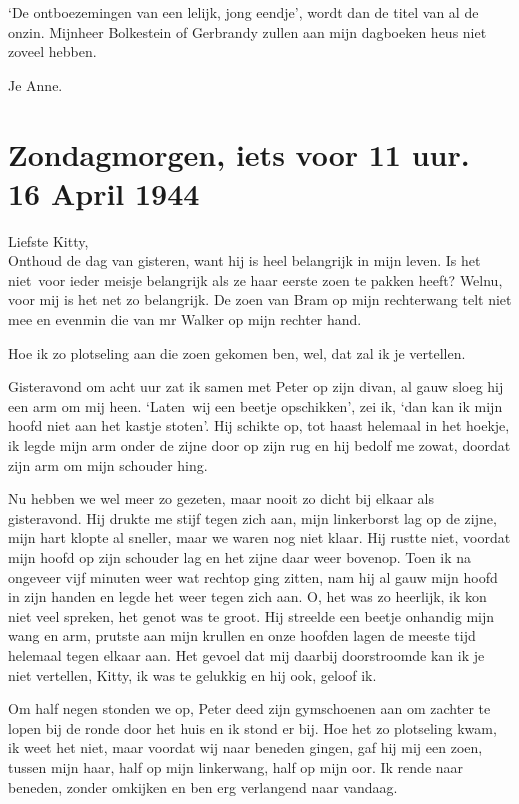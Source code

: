 \documentclass{book}
\begin{document}
`De ontboezemingen van een lelijk, jong eendje', wordt dan de titel van al de
onzin. Mijnheer Bolkestein of Gerbrandy zullen aan mijn dagboeken heus niet
zoveel hebben.

Je Anne.

\section*{Zondagmorgen, iets voor 11 uur. 16 April 1944}

Liefste Kitty,\\
Onthoud de dag van gisteren, want hij is heel belangrijk in
mijn leven. Is het niet~voor ieder meisje belangrijk als ze haar eerste zoen te
pakken heeft? Welnu, voor mij is het net zo belangrijk.  De zoen van Bram op
mijn rechterwang telt niet mee en evenmin die van mr Walker op mijn rechter
hand.

Hoe ik zo plotseling aan die zoen gekomen ben, wel, dat zal ik je vertellen.

Gisteravond om acht uur zat ik samen met Peter op zijn divan, al gauw sloeg hij
een arm om mij heen. `Laten~wij een beetje opschikken', zei ik, `dan kan ik mijn
hoofd niet aan het kastje stoten'. Hij schikte op, tot haast helemaal in het
hoekje, ik legde mijn arm onder de zijne door op zijn rug en hij bedolf me
zowat, doordat zijn arm om mijn schouder hing.

Nu hebben we wel meer zo gezeten, maar nooit zo dicht bij elkaar als
gisteravond. Hij drukte me stijf tegen zich aan, mijn linkerborst lag op de
zijne, mijn hart klopte al sneller, maar we waren nog niet klaar. Hij rustte
niet, voordat mijn hoofd op zijn schouder lag en het zijne daar weer bovenop.
Toen ik na ongeveer vijf minuten weer wat rechtop ging zitten, nam hij al gauw
mijn hoofd in zijn handen en legde het weer tegen zich aan. O, het was zo
heerlijk, ik kon niet veel spreken, het genot was te groot. Hij streelde een
beetje onhandig mijn wang en arm, prutste aan mijn krullen en onze hoofden lagen
de meeste tijd helemaal tegen elkaar aan. Het gevoel dat mij daarbij
doorstroomde kan ik je niet vertellen, Kitty, ik was te gelukkig en hij ook,
geloof ik.

Om half negen stonden we op, Peter deed zijn gymschoenen aan om zachter te lopen
bij de ronde door het huis en ik stond er bij. Hoe het zo plotseling kwam, ik
weet het niet, maar voordat wij naar beneden gingen, gaf hij mij een zoen,
tussen mijn haar, half op mijn linkerwang, half op mijn oor. Ik rende naar
beneden, zonder omkijken en ben erg verlangend naar vandaag.
\end{document}

